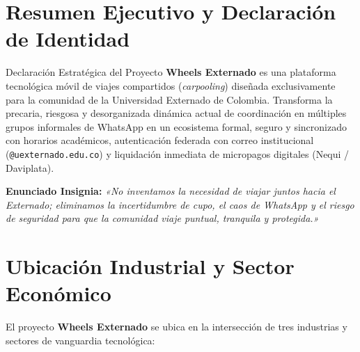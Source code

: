 \documentclass[11pt,a4paper]{article}
\begin{document}
\newpage
\tableofcontents
\newpage

\section*{Resumen Ejecutivo y Declaración de Identidad}

\begin{externadobox}{Declaración Estratégica del Proyecto}
\textbf{Wheels Externado} es una plataforma tecnológica móvil de viajes compartidos (\textit{carpooling}) diseñada exclusivamente para la comunidad de la Universidad Externado de Colombia. Transforma la precaria, riesgosa y desorganizada dinámica actual de coordinación en múltiples grupos informales de WhatsApp en un ecosistema formal, seguro y sincronizado con horarios académicos, autenticación federada con correo institucional (\texttt{@uexternado.edu.co}) y liquidación inmediata de micropagos digitales (Nequi / Daviplata).

\vspace{0.2cm}
\textbf{Enunciado Insignia:} 
\textit{«No inventamos la necesidad de viajar juntos hacia el Externado; eliminamos la incertidumbre de cupo, el caos de WhatsApp y el riesgo de seguridad para que la comunidad viaje puntual, tranquila y protegida.»}
\end{externadobox}

\vspace{0.3cm}

\section{Ubicación Industrial y Sector Económico}

El proyecto \textbf{Wheels Externado} se ubica en la intersección de tres industrias y sectores de vanguardia tecnológica:
\end{document}
